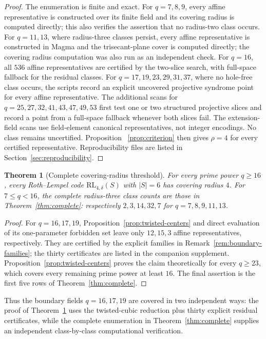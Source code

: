 \documentclass[11pt]{article}
\newcommand{\RL}{\mathrm{RL}}
\theoremstyle{plain}
\newtheorem{theorem}{Theorem}
\theoremstyle{definition}
\begin{document}
\begin{proof}
The enumeration is finite and exact.  For \(q=7,8,9\), every affine
representative is constructed over its finite field and its covering radius
is computed directly; this also verifies the assertion that no radius-two
class occurs.  For \(q=11,13\), where radius-three classes persist, every affine
representative is constructed in Magma and the trisecant-plane cover is
computed directly; the covering radius computation was also run as an
independent check.  For \(q=16\), all \(536\) affine representatives are
certified by the two-slice search, with full-space fallback for the residual
classes.  For \(q=17,19,23,29,31,37\), where no hole-free class occurs, the
scripts record an explicit uncovered projective syndrome point for every
affine representative.  The additional scans for
\(q=25,27,32,41,43,47,49,53\) first test one or two structured projective
slices and record a point from a full-space fallback whenever both slices
fail.  The extension-field scans use field-element canonical representatives,
not integer encodings.  No class remains uncertified.  Proposition
~\ref{prop:criterion} then gives \(\rho=4\) for every certified
representative.  Reproducibility files are listed in
Section~\ref{sec:reproducibility}.
\end{proof}

\begin{theorem}[Complete covering-radius threshold]\label{thm:threshold}
For every prime power \(q\ge16\), every Roth--Lempel code
\(\RL_{4,\delta}(S)\) with \(|S|=6\) has covering radius \(4\).
For \(7\le q<16\), the complete radius-three class counts are those in
Theorem~\ref{thm:complete}: respectively \(2,3,14,32,7\) for
\(q=7,8,9,11,13\).
\end{theorem}

\begin{proof}
For \(q=16,17,19\), Proposition~\ref{prop:twisted-centers} and direct
evaluation of its one-parameter forbidden set leave only \(12,15,3\)
affine representatives, respectively.  They are certified by the explicit
families in Remark~\ref{rem:boundary-families}; the thirty certificates are
listed in the companion supplement.  Proposition~\ref{prop:twisted-centers}
proves the claim theoretically for every \(q\ge23\), which covers every
remaining prime power at least \(16\).  The final assertion is the first
five rows of Theorem~\ref{thm:complete}.
\end{proof}

Thus the boundary fields \(q=16,17,19\) are covered in two independent
ways: the proof of Theorem~\ref{thm:threshold} uses the twisted-cubic
reduction plus thirty explicit residual certificates, while the complete
enumeration in Theorem~\ref{thm:complete} supplies an independent
class-by-class computational verification.
\end{document}
